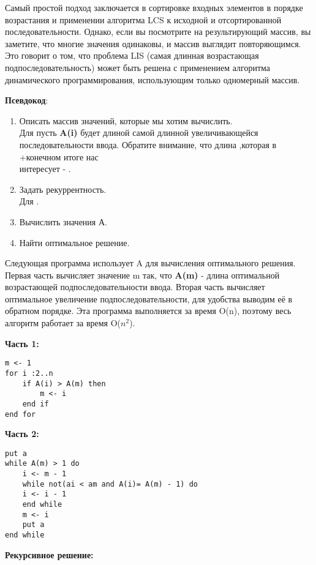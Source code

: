 Самый простой подход заключается в сортировке входных элементов в
порядке возрастания и применении алгоритма LCS к исходной и
отсортированной последовательности. Однако, если вы посмотрите на
результирующий массив, вы заметите, что многие значения одинаковы, и
массив выглядит повторяющимся. Это говорит о том, что проблема LIS (самая
длинная возрастающая подпоследовательность) может быть решена с
применением алгоритма динамического программирования, использующим
только одномерный массив.
\vspace{\baselineskip}

\textbf{Псевдокод}:
\begin{enumerate}
    \item Описать массив значений, которые мы хотим вычислить.\\
Для  пусть \textbf{A(i)} будет длиной самой длинной увеличивающейся
последовательности ввода. Обратите внимание, что длина ,которая в
+конечном итоге нас\\ интересует - .
    \item Задать рекуррентность.\\
Для .
    \item Вычислить значения А.
    \item Найти оптимальное решение.
\end{enumerate}
\vspace{\baselineskip}
Следующая программа использует A для вычисления оптимального
решения. Первая часть вычисляет значение m так, что \textbf{A(m)} - длина
оптимальной возрастающей подпоследовательности ввода. Вторая часть
вычисляет оптимальное увеличение подпоследовательности, для удобства
выводим её в обратном порядке. Эта программа выполняется за время O(n),
поэтому весь алгоритм работает за время O($n^2$).
\vspace{\baselineskip}

\textbf{Часть 1:}
\vspace{\baselineskip}
\begin{tcolorbox}
\begin{verbatim}     
m <- 1
for i :2..n
	if A(i) > A(m) then
		m <- i	
	end if
end for
\end{verbatim}
\end{tcolorbox}
\vspace{\baselineskip}
\textbf{Часть 2:}
\vspace{\baselineskip}
\begin{tcolorbox}
\begin{verbatim}
put a
while A(m) > 1 do
	i <- m - 1
	while not(ai < am and A(i)= A(m) - 1) do
	i <- i - 1
	end while
	m <- i
	put a 
end while
\end{verbatim}
\end{tcolorbox}
\vspace{\baselineskip}
\textbf{Рекурсивное решение:}
\vspace{\baselineskip}

